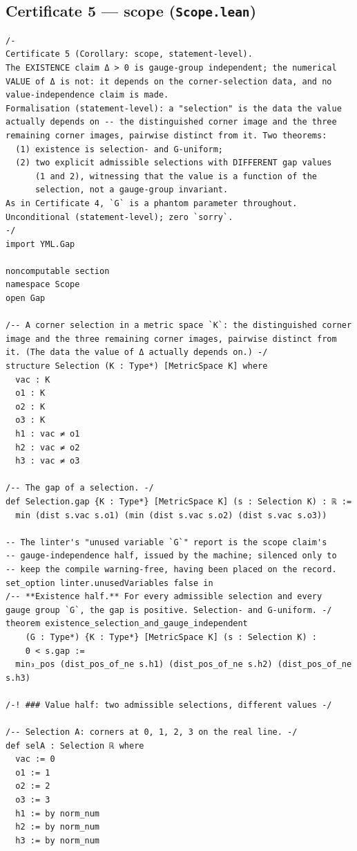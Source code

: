 \documentclass[11pt,a4paper]{article}
\theoremstyle{plain}
\theoremstyle{definition}
\theoremstyle{remark}
\begin{document}
\subsection*{Certificate 5 --- scope (\texttt{Scope.lean})}
\begin{Verbatim}[fontsize=\footnotesize,breaklines=true,breakanywhere=true,formatcom=\leanmono]
/-
Certificate 5 (Corollary: scope, statement-level).
The EXISTENCE claim Δ > 0 is gauge-group independent; the numerical
VALUE of Δ is not: it depends on the corner-selection data, and no
value-independence claim is made.
Formalisation (statement-level): a "selection" is the data the value
actually depends on -- the distinguished corner image and the three
remaining corner images, pairwise distinct from it. Two theorems:
  (1) existence is selection- and G-uniform;
  (2) two explicit admissible selections with DIFFERENT gap values
      (1 and 2), witnessing that the value is a function of the
      selection, not a gauge-group invariant.
As in Certificate 4, `G` is a phantom parameter throughout.
Unconditional (statement-level); zero `sorry`.
-/
import YML.Gap

noncomputable section
namespace Scope
open Gap

/-- A corner selection in a metric space `K`: the distinguished corner
image and the three remaining corner images, pairwise distinct from
it. (The data the value of Δ actually depends on.) -/
structure Selection (K : Type*) [MetricSpace K] where
  vac : K
  o1 : K
  o2 : K
  o3 : K
  h1 : vac ≠ o1
  h2 : vac ≠ o2
  h3 : vac ≠ o3

/-- The gap of a selection. -/
def Selection.gap {K : Type*} [MetricSpace K] (s : Selection K) : ℝ :=
  min (dist s.vac s.o1) (min (dist s.vac s.o2) (dist s.vac s.o3))

-- The linter's "unused variable `G`" report is the scope claim's
-- gauge-independence half, issued by the machine; silenced only to
-- keep the compile warning-free, having been placed on the record.
set_option linter.unusedVariables false in
/-- **Existence half.** For every admissible selection and every
gauge group `G`, the gap is positive. Selection- and G-uniform. -/
theorem existence_selection_and_gauge_independent
    (G : Type*) {K : Type*} [MetricSpace K] (s : Selection K) :
    0 < s.gap :=
  min₃_pos (dist_pos_of_ne s.h1) (dist_pos_of_ne s.h2) (dist_pos_of_ne s.h3)

/-! ### Value half: two admissible selections, different values -/

/-- Selection A: corners at 0, 1, 2, 3 on the real line. -/
def selA : Selection ℝ where
  vac := 0
  o1 := 1
  o2 := 2
  o3 := 3
  h1 := by norm_num
  h2 := by norm_num
  h3 := by norm_num


\end{Verbatim}
\end{document}
